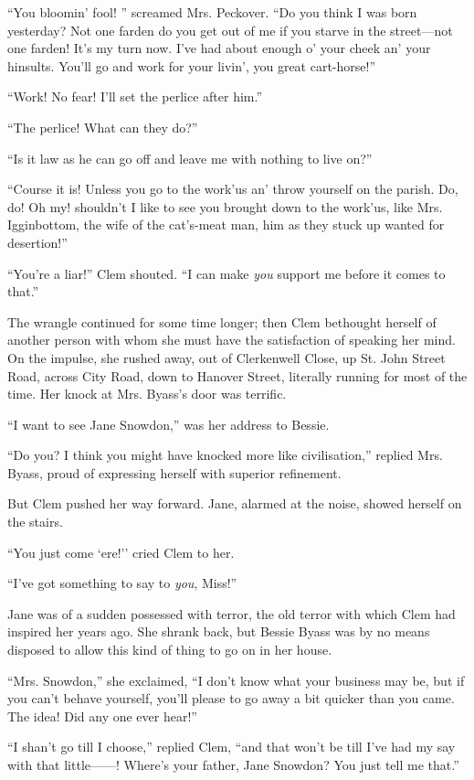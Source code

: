 ``You bloomin' fool! '' screamed Mrs. Peckover. ``Do you think I was
born yesterday? Not one farden do you get out of me if you starve in the
street---not one farden! It's my turn now. I've had about enough o' your
cheek an' your hinsults. You'll go and work for your livin', you great
cart-horse!''

``Work! No fear! I'll set the perlice after him.''

``The perlice! What can they do?''

``Is it law as he can go off and leave me with nothing to live on?''

``Course it is! Unless you go to the work'us an' throw yourself on the
parish. Do, do! Oh my! shouldn't I like to see you brought down to the
work'us, like Mrs. Igginbottom, the wife of the cat's-meat man, him as
they stuck up wanted for desertion!''

``You're a liar!'' Clem shouted. ``I can make \emph{you} support me
before it comes to that.''

{}The wrangle continued for some time longer; then Clem bethought
herself of another person with whom she must have the satisfaction of
speaking her mind. On the impulse, she rushed away, out of Clerkenwell
Close, up St. John Street Road, across City Road, down to Hanover
Street, literally running for most of the time. Her knock at Mrs.
Byass's door was terrific.

``I want to see Jane Snowdon,'' was her address to Bessie.

``Do you? I think you might have knocked more like civilisation,''
replied Mrs. Byass, proud of expressing herself with superior
refinement.

But Clem pushed her way forward. Jane, alarmed at the noise, showed
herself on the stairs.

``You just come `ere!'' cried Clem to her.

``I've got something to say to \emph{you}, Miss!''

Jane was of a sudden possessed with terror, the old terror with which
Clem had inspired her years ago. She shrank back, but Bessie Byass was
by no means disposed to allow this kind of thing to go on in her house.

``Mrs. Snowdon,'' she exclaimed, ``I don't {}know what your business may
be, but if you can't behave yourself, you'll please to go away a bit
quicker than you came. The idea! Did any one ever hear!''

``I shan't go till I choose,'' replied Clem, ``and that won't be till
I've had my say with that little{{------}}! Where's your father, Jane
Snowdon? You just tell me that.''

